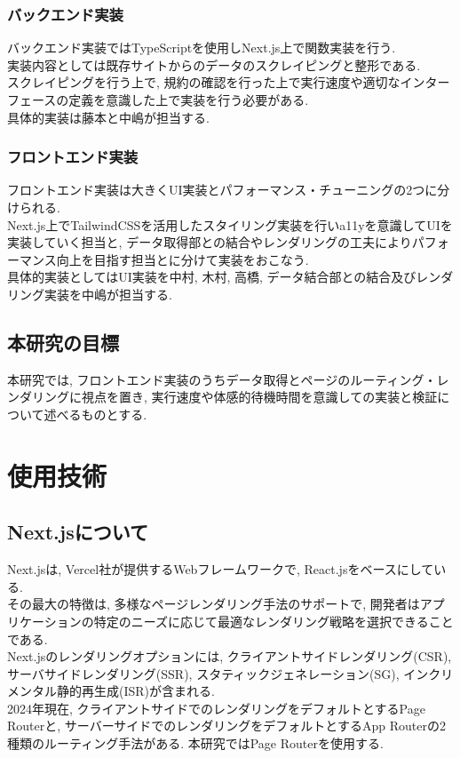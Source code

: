 \subsubsection{バックエンド実装}
バックエンド実装ではTypeScriptを使用しNext.js上で関数実装を行う. \\
実装内容としては既存サイトからのデータのスクレイピングと整形である. \\
スクレイピングを行う上で, 規約の確認を行った上で実行速度や適切なインターフェースの定義を意識した上で実装を行う必要がある.\\
具体的実装は藤本と中嶋が担当する.

\subsubsection{フロントエンド実装}
フロントエンド実装は大きくUI実装とパフォーマンス・チューニングの2つに分けられる.\\
Next.js上でTailwindCSSを活用したスタイリング実装を行いa11yを意識してUIを実装していく担当と, データ取得部との結合やレンダリングの工夫によりパフォーマンス向上を目指す担当とに分けて実装をおこなう.\\
具体的実装としてはUI実装を中村, 木村, 高橋, データ結合部との結合及びレンダリング実装を中嶋が担当する.

\subsection{本研究の目標}
本研究では, フロントエンド実装のうちデータ取得とページのルーティング・レンダリングに視点を置き, 実行速度や体感的待機時間を意識しての実装と検証について述べるものとする. 

\section{使用技術}
\subsection{Next.jsについて}
Next.jsは, Vercel社が提供するWebフレームワークで, React.jsをベースにしている. \\
その最大の特徴は, 多様なページレンダリング手法のサポートで, 開発者はアプリケーションの特定のニーズに応じて最適なレンダリング戦略を選択できることである.\cite{no5} \\
Next.jsのレンダリングオプションには, クライアントサイドレンダリング(CSR), サーバサイドレンダリング(SSR), スタティックジェネレーション(SG), インクリメンタル静的再生成(ISR)が含まれる. \\
2024年現在, クライアントサイドでのレンダリングをデフォルトとするPage Routerと, サーバーサイドでのレンダリングをデフォルトとするApp Routerの2種類のルーティング手法がある. 本研究ではPage Routerを使用する. 

